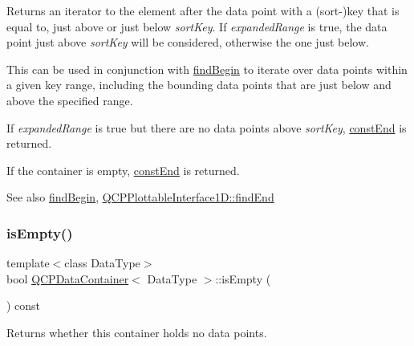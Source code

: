 Returns an iterator to the element after the data point with a (sort-\/)key that is equal to, just above or just below {\itshape sort\+Key}. If {\itshape expanded\+Range} is true, the data point just above {\itshape sort\+Key} will be considered, otherwise the one just below.

This can be used in conjunction with \hyperlink{classQCPDataContainer_a2ad8a5399072d99a242d3a6d2d7e278a}{find\+Begin} to iterate over data points within a given key range, including the bounding data points that are just below and above the specified range.

If {\itshape expanded\+Range} is true but there are no data points above {\itshape sort\+Key}, \hyperlink{classQCPDataContainer_aa7f7cf239b85b1a28de3d675cc5b3da1}{const\+End} is returned.

If the container is empty, \hyperlink{classQCPDataContainer_aa7f7cf239b85b1a28de3d675cc5b3da1}{const\+End} is returned.

\begin{DoxySeeAlso}{See also}
\hyperlink{classQCPDataContainer_a2ad8a5399072d99a242d3a6d2d7e278a}{find\+Begin}, \hyperlink{classQCPPlottableInterface1D_a5deced1016bc55a41a2339619045b295}{Q\+C\+P\+Plottable\+Interface1\+D\+::find\+End} 
\end{DoxySeeAlso}
\mbox{\label{classQCPDataContainer_a7bdebfccd2f9f84bf032882f9d6b00a8}} 
\subsubsection{\texorpdfstring{is\+Empty()}{isEmpty()}}
{\footnotesize\ttfamily template$<$class Data\+Type$>$ \\
bool \hyperlink{classQCPDataContainer}{Q\+C\+P\+Data\+Container}$<$ Data\+Type $>$\+::is\+Empty (\begin{DoxyParamCaption}{ }\end{DoxyParamCaption}) const\hspace{0.3cm}{\ttfamily [inline]}}

Returns whether this container holds no data points. \mbox{\label{classQCPDataContainer_aba6e1a93c21ccc56a432b4a02c9d0ed2}} 
